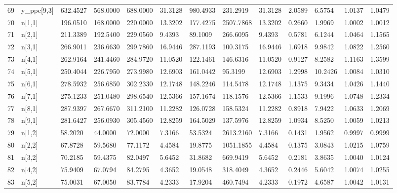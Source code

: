 \begin{table}[ht]
\begin{tabular}{rllllllllllll}
  69 & y\_ppc[9,3] &  632.4527 &  568.0000 &  688.0000 &   31.3128 &     980.4933 &  231.2919 &   31.3128 &  2.0589 &  6.5754 & 1.0137 & 1.0479 \\ 
  70 & n[1,1] &  196.0510 &  168.0000 &  220.0000 &   13.3202 &     177.4275 & 2507.7868 &   13.3202 &  0.2660 &  1.9969 & 1.0002 & 1.0012 \\ 
  71 & n[2,1] &  211.3389 &  192.5400 &  229.0560 &    9.4393 &      89.1009 &  266.6095 &    9.4393 &  0.5781 &  6.1244 & 1.0464 & 1.1565 \\ 
  72 & n[3,1] &  266.9011 &  236.6630 &  299.7860 &   16.9446 &     287.1193 &  100.3175 &   16.9446 &  1.6918 &  9.9842 & 1.0822 & 1.2560 \\ 
  73 & n[4,1] &  262.9164 &  241.4460 &  284.9720 &   11.0520 &     122.1461 &  146.6316 &   11.0520 &  0.9127 &  8.2582 & 1.1163 & 1.3599 \\ 
  74 & n[5,1] &  250.4044 &  226.7950 &  273.9980 &   12.6903 &     161.0442 &   95.3199 &   12.6903 &  1.2998 & 10.2426 & 1.0084 & 1.0310 \\ 
  75 & n[6,1] &  278.5932 &  256.6850 &  302.2330 &   12.1748 &     148.2246 &  114.5478 &   12.1748 &  1.1375 &  9.3434 & 1.0426 & 1.1440 \\ 
  76 & n[7,1] &  275.1233 &  251.0480 &  298.6540 &   12.5366 &     157.1674 &  118.1576 &   12.5366 &  1.1533 &  9.1996 & 1.0748 & 1.2334 \\ 
  77 & n[8,1] &  287.9397 &  267.6670 &  311.2100 &   11.2282 &     126.0728 &  158.5324 &   11.2282 &  0.8918 &  7.9422 & 1.0633 & 1.2069 \\ 
  78 & n[9,1] &  281.6427 &  256.0930 &  305.4560 &   12.8259 &     164.5029 &  137.5976 &   12.8259 &  1.0934 &  8.5250 & 1.0059 & 1.0213 \\ 
  79 & n[1,2] &   58.2020 &   44.0000 &   72.0000 &    7.3166 &      53.5324 & 2613.2160 &    7.3166 &  0.1431 &  1.9562 & 0.9997 & 0.9999 \\ 
  80 & n[2,2] &   67.8728 &   59.5680 &   77.1172 &    4.4584 &      19.8775 & 1051.1855 &    4.4584 &  0.1375 &  3.0843 & 1.0215 & 1.0759 \\ 
  81 & n[3,2] &   70.2185 &   59.4375 &   82.0497 &    5.6452 &      31.8682 &  669.9419 &    5.6452 &  0.2181 &  3.8635 & 1.0040 & 1.0124 \\ 
  82 & n[4,2] &   75.9409 &   67.0794 &   84.2795 &    4.3652 &      19.0548 &  318.4049 &    4.3652 &  0.2446 &  5.6042 & 1.0074 & 1.0255 \\ 
  83 & n[5,2] &   75.0031 &   67.0050 &   83.7784 &    4.2333 &      17.9204 &  460.7494 &    4.2333 &  0.1972 &  4.6587 & 1.0042 & 1.0131 \\ 

\end{tabular}
\end{table}
